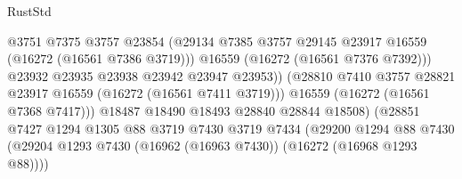 \begin{lexlean}{RustStd}
\begin{coremodule}
                                              @3751
                                              @7375
                                              @3757
                                              @23854
                                              (@29134
                                                @7385
                                                @3757
                                                @29145
                                                @23917
                                                @16559
                                                (@16272 (@16561 @7386 @3719)))
                                              @16559
                                              (@16272 (@16561 @7376 @7392)))
                                            @23932
                                            @23935
                                            @23938
                                            @23942
                                            @23947
                                            @23953))
                                        (@28810
                                          @7410
                                          @3757
                                          @28821
                                          @23917
                                          @16559
                                          (@16272 (@16561 @7411 @3719)))
                                        @16559
                                        (@16272 (@16561 @7368 @7417)))
                                      @18487
                                      @18490
                                      @18493
                                      @28840
                                      @28844
                                      @18508)
                                    (@28851
                                      @7427
                                      @1294
                                      @1305
                                      @88
                                      @3719
                                      @7430
                                      @3719
                                      @7434
                                      (@29200
                                        @1294
                                        @88
                                        @7430
                                        (@29204
                                          @1293
                                          @7430
                                          (@16962 (@16963 @7430))
                                          (@16272 (@16968 @1293 @88))))

\end{coremodule}
\end{lexlean}
